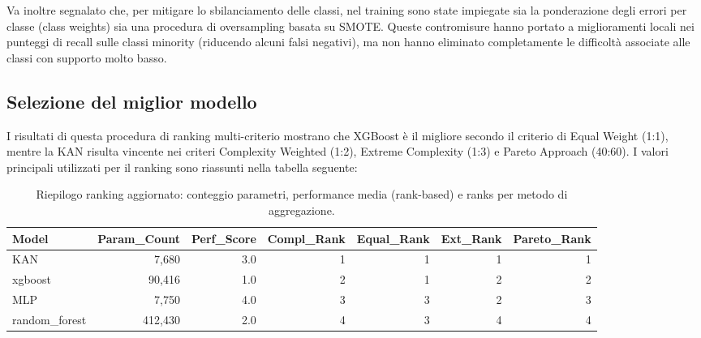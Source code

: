 \documentclass[a4paper,12pt]{report}
\begin{document}
	Va inoltre segnalato che, per mitigare lo sbilanciamento delle classi, nel training sono state impiegate sia la ponderazione degli errori per classe (class weights) sia una procedura di oversampling basata su SMOTE. Queste contromisure hanno portato a miglioramenti locali nei punteggi di recall sulle classi minority (riducendo alcuni falsi negativi), ma non hanno eliminato completamente le difficoltà associate alle classi con supporto molto basso.
	
	\subsection{Selezione del miglior modello}
	I risultati di questa procedura di ranking multi-criterio mostrano che XGBoost è il migliore secondo il criterio di Equal Weight (1:1), mentre la KAN risulta vincente nei criteri Complexity Weighted (1:2), Extreme Complexity (1:3) e Pareto Approach (40:60). I valori principali utilizzati per il ranking sono riassunti nella tabella seguente:
	
	\begin{table}[H]
		\centering
		\setlength{\tabcolsep}{6pt}
		\caption{Riepilogo ranking aggiornato: conteggio parametri, performance media (rank-based) e ranks per metodo di aggregazione.}
		\begin{tabular}{lrrrrrr}
			\toprule
			\textbf{Model} & \textbf{Param\_Count} & \textbf{Perf\_Score} & \textbf{Compl\_Rank} & \textbf{Equal\_Rank} & \textbf{Ext\_Rank} & \textbf{Pareto\_Rank} \\
			\midrule
			KAN           & 7,680    & 3.0 & 1 & 1 & 1 & 1 \\
			xgboost       & 90,416   & 1.0 & 2 & 1 & 2 & 2 \\
			MLP           & 7,750    & 4.0 & 3 & 3 & 2 & 3 \\
			random\_forest& 412,430  & 2.0 & 4 & 3 & 4 & 4 \\
			\bottomrule
		\end{tabular}
	\end{table}
	
\end{document}

